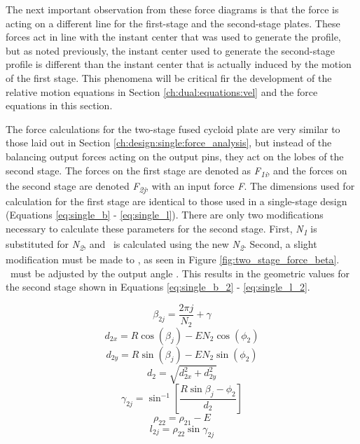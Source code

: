 The next important observation from these force diagrams is that the force is acting on a different line for the first-stage and the second-stage plates. These forces act in line with the instant center that was used to generate the profile, but as noted previously, the instant center used to generate the second-stage profile is different than the instant center that is actually induced by the motion of the first stage. This phenomena will be critical fir the development of the relative motion equations in Section \ref{ch:dual:equations:vel} and the force equations in this section. 

The force calculations for the two-stage fused cycloid plate are very similar to those laid out in Section \ref{ch:design:single:force_analysis}, but instead of the balancing output forces acting on the output pins, they act on the lobes of the second stage. The forces on the first stage are denoted as \textit{F\textsubscript{1i}}, and the forces on the second stage are denoted \textit{F\textsubscript{2j}}, with an input force \textit{F}. The dimensions used for calculation for the first stage are identical to those used in a single-stage design (Equations \ref{eq:single_b} - \ref{eq:single_l}). There are only two modifications necessary to calculate these parameters for the second stage. First, \textit{N\textsubscript{1}} is substituted for \textit{N\textsubscript{2}}, and \textrho\ is calculated using the new \textit{N\textsubscript{2}}. Second, a slight modification must be made to \textbeta, as seen in Figure \ref{fig:two_stage_force_beta}. \textbeta\ must be adjusted by the output angle \textalpha. This results in the geometric values for the second stage shown in Equations \ref{eq:single_b_2} - \ref{eq:single_l_2}.

\begin{equation} \label{eq:single_b_2}
\beta_{2j} = \frac{2\pi j}{N_2} + \gamma
\end{equation}
\begin{equation} \label{eq:single_d_x_2}
d_{2x} = R \cos(\beta_j) - E N_2 \cos(\phi_2)
\end{equation}
\begin{equation} \label{eq:single_d_y_2}
d_{2y} = R\sin(\beta_j) - E N_2 \sin(\phi_2)
\end{equation}
\begin{equation} \label{eq:single_d_2}
d_2 = \sqrt{d_{2x}^2 + d_{2y}^2}
\end{equation}
\begin{equation} \label{eq:single_gamma_2}
\gamma_{2j} = \sin^{-1}\left[{\frac{R \sin{\beta_j - \phi_2}}{d_2}}\right]
\end{equation}
\begin{equation} \label{eq:single_rho2_2}
\rho_{22} = \rho_{21} - E
\end{equation}
\begin{equation} \label{eq:single_l_2}
l_{2j} = \rho_{22} \sin{\gamma_{2j}}
\end{equation}


